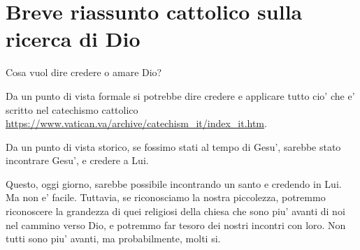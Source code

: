 %
%


%
%


\section{Breve riassunto cattolico sulla ricerca di Dio}
Cosa vuol dire credere o amare Dio?

Da un punto di vista formale si potrebbe dire credere e applicare tutto cio' che e' scritto nel catechismo cattolico \url{https://www.vatican.va/archive/catechism\_it/index\_it.htm}.

Da un punto di vista storico, se fossimo stati al tempo di Gesu', sarebbe stato incontrare Gesu', e credere a Lui.

Questo, oggi giorno, sarebbe possibile incontrando un santo e credendo in Lui. Ma non e' facile. Tuttavia, se riconosciamo la nostra piccolezza, potremmo riconoscere la grandezza di quei religiosi della chiesa che sono piu' avanti di noi nel cammino verso Dio, e potremmo far tesoro dei nostri incontri con loro. Non tutti sono piu' avanti, ma probabilmente, molti si.

